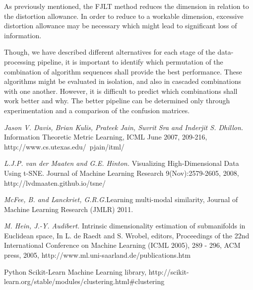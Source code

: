 \documentclass[12pt]{article}
\begin{document}
As previously mentioned, the FJLT method reduces the dimension in relation to the distortion allowance.  In order to reduce to a workable dimension, excessive distortion allowance may be necessary which might lead to significant loss of information.

Though, we have described different alternatives for each stage of the data-processing pipeline, it is important to identify which permutation of the combination of algorithm sequences shall provide the best performance. These algorithms might be evaluated in isolation, and also in cascaded combinations with one another. However, it is difficult to predict which combinations shall work better and why. The better pipeline can be determined only through experimentation and a comparison of the confusion matrices. 


\begin{thebibliography}{5}
\textit{Jason V. Davis, Brian Kulis, Prateek Jain, Suvrit Sra and Inderjit S. Dhillon.} Information Theoretic Metric Learning, ICML June 2007, 209-216,  http://www.cs.utexas.edu/~pjain/itml/

\textit{L.J.P. van der Maaten and G.E. Hinton.} Visualizing High-Dimensional Data Using t-SNE. Journal of Machine Learning Research 9(Nov):2579-2605, 2008, http://lvdmaaten.github.io/tsne/

\textit{McFee, B. and Lanckriet, G.R.G.}Learning multi-modal similarity, Journal of Machine Learning Research (JMLR) 2011.

\textit{M. Hein, J.-Y. Audibert. }Intrinsic dimensionality estimation of submanifolds in Euclidean space,
In L. de Raedt and S. Wrobel, editors, Proceedings of the 22nd International Conference on Machine Learning (ICML 2005), 289 - 296, ACM press, 2005, http://www.ml.uni-saarland.de/publications.htm

 Python Scikit-Learn Machine Learning library, http://scikit-learn.org/stable/modules/clustering.html\#clustering

\end{thebibliography}
\end{document}
